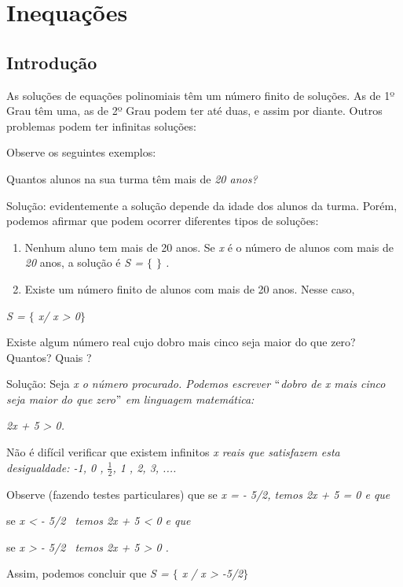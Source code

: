 \chapter{Inequações}

\section{Introdução}

As soluções de equações polinomiais têm um número finito de soluções. As de 1º Grau têm uma, as de 2º Grau podem ter até duas, e assim por diante. Outros problemas podem ter infinitas soluções:

Observe os seguintes exemplos:


\begin{texemplo}
Quantos alunos na sua turma têm mais de \textit{20 anos?}

Solução: evidentemente a solução depende da idade dos alunos da turma. Porém, podemos afirmar que podem ocorrer diferentes tipos de soluções:

\begin{enumerate}
	\item Nenhum aluno tem mais de 20 anos. Se \textit{x }é o número de alunos com mais de \textit{20} anos, a solução é \textit{S = $ \{ $ $ \} $ .}

	\item Existe um número finito de alunos com mais de 20 anos. Nesse caso, 
\end{enumerate}


\textit{S = $ \{ $ x/ x > 0$ \} $ \qedsymbol{}}
\end{texemplo}

\begin{texemplo}
Existe algum número real cujo dobro mais cinco seja maior do que zero? Quantos? Quais ?

Solução: Seja \textit{x o número procurado. Podemos escrever $``$dobro de x mais cinco seja maior do que zero$"$  em linguagem matemática:}

\textit{2x + 5 > 0. }

Não é difícil verificar que existem infinitos \textit{x reais que satisfazem esta desigualdade: -1, 0 , $\frac{1}{2}$, 1 , 2, 3, ....}

Observe (fazendo testes particulares) que se \textit{x = - 5/2, temos 2x + 5 = 0 e que }

se \textit{x < - 5/2~ temos 2x + 5 < 0 e que }

se \textit{x > - 5/2~ temos 2x + 5 > 0 .}

Assim, podemos concluir que \textit{S = $ \{ $ x  / x > -5/2$ \} $ \qedsymbol{}}
\end{texemplo}

